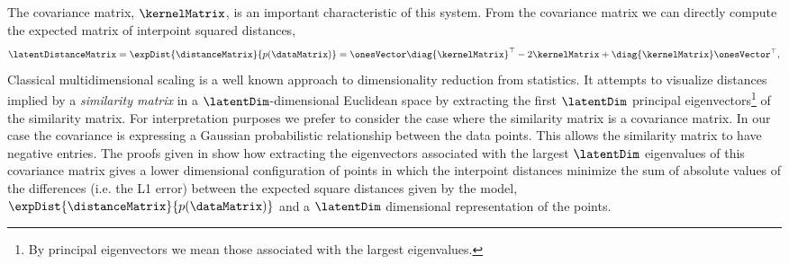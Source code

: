 The covariance matrix, $\kernelMatrix$, is an important characteristic
of this system. From the covariance matrix we can directly compute the
expected matrix of interpoint squared distances,
\[
\latentDistanceMatrix=\expDist{\distanceMatrix}{p(\dataMatrix)} =
\onesVector \diag{\kernelMatrix}^\top -2\kernelMatrix +
\diag{\kernelMatrix}\onesVector^\top,
\]
Classical multidimensional scaling \citep[see][for
a very solid treatment]{Mardia:multivariate79} is a well known
approach to dimensionality reduction from statistics. It attempts to
visualize distances implied by a \emph{similarity matrix} in a
$\latentDim$-dimensional Euclidean space by extracting the first
$\latentDim$ principal eigenvectors\footnote{By principal eigenvectors
  we mean those associated with the largest eigenvalues.} of the
similarity matrix. For interpretation purposes we prefer to consider
the case where the similarity matrix is a covariance matrix. In our
case the covariance is expressing a Gaussian probabilistic
relationship between the data points. This allows the similarity
matrix to have negative entries. The proofs given in
\citet{Mardia:multivariate79} show how extracting the eigenvectors
associated with the largest $\latentDim$ eigenvalues of this
covariance matrix gives a lower dimensional configuration of points
in which the interpoint distances minimize the sum of absolute values
of the differences (i.e. the L1 error) between the expected square
distances given by the model,
$\expDist{\distanceMatrix}{p(\dataMatrix)}$ and a $\latentDim$
dimensional representation of the points. 

